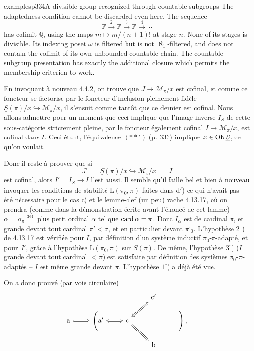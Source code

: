 \begin{dcomment}{examples}{p334}{A divisible group recognized through countable subgroups}
The adaptedness condition cannot be discarded even here. The sequence
\[
 \mathbb Z\xrightarrow{\;2\;}\mathbb Z
 \xrightarrow{\;3\;}\mathbb Z
 \xrightarrow{\;4\;}\cdots
\]
has colimit $\mathbb Q$, using the maps $m\mapsto m/(n+1)!$ at stage $n$. None of its stages is divisible. Its indexing poset $\omega$ is filtered but is not $\aleph_1$-filtered, and does not contain the colimit of its own unbounded countable chain. The countable-subgroup presentation has exactly the additional closure which permits the membership criterion to work.
\end{dcomment}


En invoquant à nouveau 4.4.2, on trouve que $J \longrightarrow \mathcal{M}_\pi/x$ est cofinal, et comme ce foncteur se factorise par le foncteur d'inclusion pleinement fidèle $\underline{S}(\pi)/x \hookrightarrow \mathcal{M}_\pi/x$, il s'ensuit comme tantôt que ce dernier est cofinal. Nous allons admettre pour un moment que ceci implique que l'image inverse $I_{\underline{S}}$ de cette sous-catégorie strictement pleine, par le foncteur également cofinal $I \longrightarrow \mathcal{M}_\pi/x$, est cofinal dans $I$. Ceci étant, l'équivalence $(**')$ (p. 333) implique $x \in \operatorname{Ob}\underline{S}$, ce qu'on voulait.

Donc il reste à prouver que si
\[
J' \ = \ \underline{S}(\pi)/x \hookrightarrow \mathcal{M}_\pi/x \ = \ J
\]
est cofinal, alors $I' = I_{\underline{S}} \longrightarrow I$ l'est aussi. Il semble qu'il faille bel et bien à nouveau invoquer les conditions de stabilité $\mathrm{L}(\pi_0,\pi)$ faites dans d$'$) ce qui n'avait pas été nécessaire pour le cas c) et
le lemme-clef (un peu) vache 4.13.17, où on prendra (comme dans la démonstration écrite
avant l'énoncé de cet lemme) %
$\alpha = \alpha_\pi \overset{\text{déf}}{=}$ plus petit ordinal $\alpha$ tel que $\operatorname{card}\alpha = \pi$. Donc $I_\alpha$ est de cardinal $\pi$, et grande devant tout cardinal $\pi' < \pi$, et en particulier devant $\pi'_0$. L'hypothèse $2^\circ$) de 4.13.17 est vérifiée pour $I$, par définition d'un système inductif $\pi_0$-$\pi$-adapté, et pour $J'$, grâce à l'hypothèse $\mathrm{L}(\pi_0,\pi)$ sur $\underline{S}(\pi)$. De même, l'hypothèse $3^\circ$) ($I$ grande devant tout cardinal $< \pi$) est satisfaite par définition des systèmes $\pi_0$-$\pi$-adaptés -- $I$ est même grande devant $\pi$. L'hypothèse $1^\circ$) a déjà été vue.

On a donc prouvé (par voie circulaire)
\[
\begin{tikzcd}[row sep=small]
& & & \mathrm{c}' & \\
\mathrm{a} \arrow[r, Rightarrow] & \Bigg(\mathrm{a}' \arrow[r, Leftrightarrow] & \mathrm{c} \arrow[ur, Leftrightarrow] \arrow[dr, Rightarrow] & & \Bigg)\, , \\ %
& & & \mathrm{b} &
\end{tikzcd}
\]


